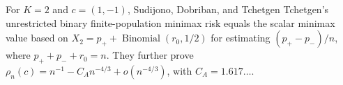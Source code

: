 For \(K=2\) and \(c=(1,-1)\), Sudijono, Dobriban, and Tchetgen Tchetgen's unrestricted binary finite-population minimax risk equals the scalar minimax value based on \(X_2=p_++\operatorname{Binomial}(r_0,1/2)\) for estimating \((p_+-p_-)/n\), where \(p_++p_-+r_0=n\).  They further prove \(\rho_n(c)=n^{-1}-C_A n^{-4/3}+o(n^{-4/3})\), with \(C_A=1.617\ldots\).